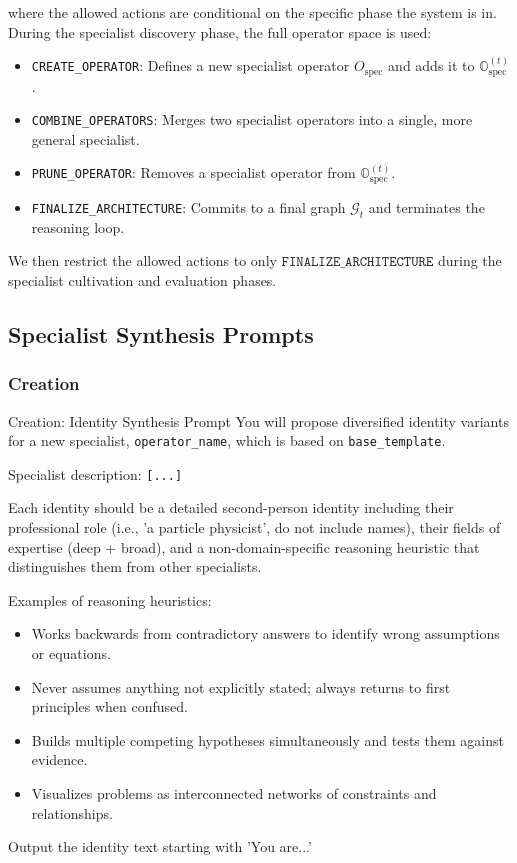\documentclass{article} %
\begin{document}
where the allowed actions are conditional on the specific phase the system is in. During the specialist discovery phase, the full operator space is used:
\begin{itemize}
    \item \texttt{CREATE\_OPERATOR}: Defines a new specialist operator $O_{\text{spec}}$ and adds it to $\mathbb{O}_{\text{spec}}^{(t)}$.
    \item \texttt{COMBINE\_OPERATORS}: Merges two specialist operators into a single, more general specialist.
    \item \texttt{PRUNE\_OPERATOR}: Removes a specialist operator from $\mathbb{O}_{\text{spec}}^{(t)}$.
    \item \texttt{FINALIZE\_ARCHITECTURE}: Commits to a final graph $\mathcal{G}_t$ and terminates the reasoning loop.
\end{itemize}
We then restrict the allowed actions to only \(\texttt{FINALIZE\_ARCHITECTURE}\) during the specialist cultivation and evaluation phases.

\subsection{Specialist Synthesis Prompts}
\label{app:spec_synthesis}

\subsubsection{Creation}

\begin{promptbox}{Creation: Identity Synthesis Prompt}
You will propose diversified identity variants for a new specialist, \texttt{{operator\_name}}, which is based on \texttt{{base\_template}}.

\medskip\noindent
Specialist description: \texttt{[...]}
\medskip

Each identity should be a detailed second-person identity including their professional role (i.e., 'a particle physicist', do not include names), their fields of expertise (deep + broad), and a non-domain-specific reasoning heuristic that distinguishes them from other specialists.

\medskip\noindent
Examples of reasoning heuristics:
\begin{itemize}[leftmargin=*, topsep=2pt, itemsep=0pt]
    \item Works backwards from contradictory answers to identify wrong assumptions or equations.
    \item Never assumes anything not explicitly stated; always returns to first principles when confused.
    \item Builds multiple competing hypotheses simultaneously and tests them against evidence.
    \item Visualizes problems as interconnected networks of constraints and relationships.
\end{itemize}
\medskip

Output the identity text starting with 'You are...'
\end{promptbox}
\end{document}

